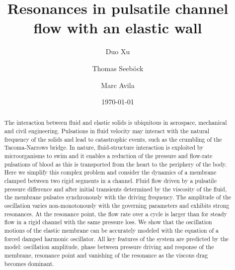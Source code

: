 \documentclass[aps,prl,reprint,superscriptaddress,floatfix]{revtex4-1}
\begin{document}
\preprint{}

\title{Resonances in pulsatile channel flow with an elastic wall}%

\author{Duo Xu}
%
%

\author{Thomas Seeb{\"o}ck}

\author{Marc Avila}
%


\date{\today}%

\begin{abstract}
The interaction between fluid and elastic solids is ubiquitous in aerospace, mechanical and civil engineering. Pulsations in fluid velocity may interact with the natural frequency of the solids and lead to catastrophic events, such as the crumbling of the Tacoma-Narrows bridge. In nature, fluid-structure interaction is exploited by microorganisms to swim and it enables a reduction of the pressure and flow-rate pulsations of blood as this is transported from the heart to the periphery of the body.  Here we simplify this complex problem and consider the dynamics of a membrane clamped between two rigid segments in a channel. Fluid flow driven by a pulsatile pressure difference and after initial transients determined by the viscosity of the fluid, the membrane pulsates synchronously with the driving frequency. The amplitude of the oscillation varies non-monotonously with the governing parameters and exhibits strong resonances. At the resonance point, the flow rate over a cycle is larger than for steady flow in a rigid channel with the same pressure loss. We show that the oscillation motions of the elastic membrane can be accurately modeled with the equation of a forced damped harmonic oscillator. All key features of the system are predicted by the model: oscillation amplitude, phase between pressure driving and response of the membrane, resonance point and vanishing of the resonance as the viscous drag becomes dominant. 
\end{abstract}
\end{document}
